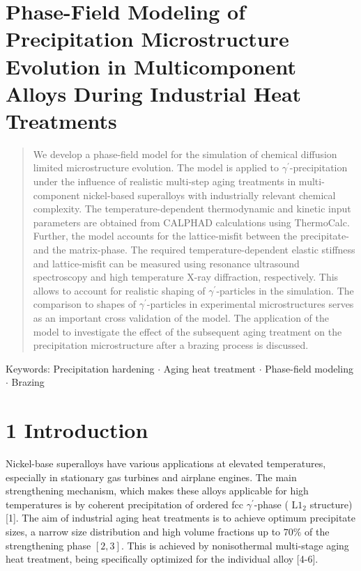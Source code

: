\documentclass[10pt]{article}
\begin{document}
\section*{Phase-Field Modeling of Precipitation Microstructure Evolution in Multicomponent Alloys During Industrial Heat Treatments }


\begin{abstract}
We develop a phase-field model for the simulation of chemical diffusion limited microstructure evolution. The model is applied to $\gamma^{\prime}$-precipitation under the influence of realistic multi-step aging treatments in multi-component nickel-based superalloys with industrially relevant chemical complexity. The temperature-dependent thermodynamic and kinetic input parameters are obtained from CALPHAD calculations using ThermoCalc. Further, the model accounts for the lattice-misfit between the precipitate- and the matrix-phase. The required temperature-dependent elastic stiffness and lattice-misfit can be measured using resonance ultrasound spectroscopy and high temperature $\mathrm{X}$-ray diffraction, respectively. This allows to account for realistic shaping of $\gamma^{\prime}$-particles in the simulation. The comparison to shapes of $\gamma^{\prime}$-particles in experimental microstructures serves as an important cross validation of the model. The application of the model to investigate the effect of the subsequent aging treatment on the precipitation microstructure after a brazing process is discussed.
\end{abstract}

Keywords: Precipitation hardening $\cdot$ Aging heat treatment $\cdot$ Phase-field modeling $\cdot$ Brazing

\section*{1 Introduction}
Nickel-base superalloys have various applications at elevated temperatures, especially in stationary gas turbines and airplane engines. The main strengthening mechanism, which makes these alloys applicable for high temperatures is by coherent precipitation of ordered fcc $\gamma^{\prime}$-phase ( $\mathrm{L} 1_{2}$ structure) [1]. The aim of industrial aging heat treatments is to achieve optimum precipitate sizes, a narrow size distribution and high volume fractions up to $70 \%$ of the strengthening phase $[2,3]$. This is achieved by nonisothermal multi-stage aging heat treatment, being specifically optimized for the individual alloy [4-6].
\end{document}
